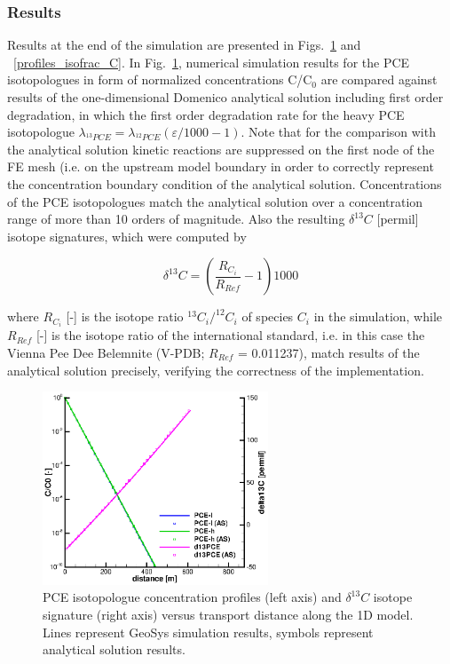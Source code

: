 \subsubsection*{Results}

Results at the end of the simulation are presented in Figs.~\ref{profiles_isofrac_C_AS} and ~\ref{profiles_isofrac_C}.
In Fig.~\ref{profiles_isofrac_C_AS}, numerical simulation results for the PCE isotopologues in form of normalized concentrations C/C$_0$ are compared against results of the one-dimensional Domenico analytical solution including first order degradation, in which the first order degradation rate for the heavy PCE isotopologue $\lambda_{^{13}PCE} = \lambda_{^{12}PCE}(\varepsilon/1000 -1)$. Note that for the comparison with the analytical solution kinetic reactions are suppressed on the first node of the FE mesh (i.e. on the upstream model boundary in order to correctly represent the concentration boundary condition of the analytical solution. Concentrations of the PCE isotopologues match the analytical solution over a concentration range of more than 10 orders of magnitude. Also the resulting $\delta^{13}C$ [permil] isotope signatures, which were computed by

\begin{equation}
    \delta^{13} C =  \left(
    \frac{R_{C_i}}{R_{Ref}} -1
    \right)1000
    \label{isotop_signature}
\end{equation}

where $R_{C_i}$ [-] is the isotope ratio $^{13}{C_i}/^{12}{C_i}$ of species $C_i$ in the simulation, while $R_{Ref}$  [-] is the isotope ratio of the international standard, i.e. in this case the Vienna Pee Dee Belemnite (V-PDB; $R_{Ref}$ = 0.011237), match results of the analytical solution precisely, verifying the correctness of the  implementation.

\begin{figure}[htbp]
\centering
\includegraphics[width=0.6\textwidth]{C/figures/Fig_isofrac_AS.eps}
\caption{PCE isotopologue concentration profiles (left axis) and $\delta^{13}C$ isotope signature (right axis) versus transport distance along the 1D model. Lines represent GeoSys simulation results, symbols represent analytical solution results.}
\label{profiles_isofrac_C_AS}
\end{figure}

